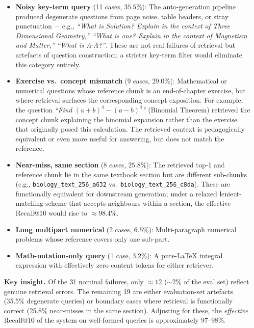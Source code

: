 \documentclass[conference]{IEEEtran}
\begin{document}
\begin{itemize}
    \item \textbf{Noisy key-term query} (11 cases, $35.5\%$): The auto-generation pipeline produced degenerate questions from page noise, table headers, or stray punctuation~--~e.g., \emph{``What is Solution? Explain in the context of Three Dimensional Geometry,''} \emph{``What is one? Explain in the context of Magnetism and Matter,''} \emph{``What is A$\cdot$A?''}. These are not real failures of retrieval but artefacts of question construction; a stricter key-term filter would eliminate this category entirely.
    \item \textbf{Exercise vs.\ concept mismatch} (9 cases, $29.0\%$): Mathematical or numerical questions whose reference chunk is an end-of-chapter exercise, but where retrieval surfaces the corresponding concept exposition. For example, the question \emph{``Find $(a+b)^4 - (a-b)^4$''} (Binomial Theorem) retrieved the concept chunk explaining the binomial expansion rather than the exercise that originally posed this calculation. The retrieved context is pedagogically equivalent or even more useful for answering, but does not match the reference.
    \item \textbf{Near-miss, same section} (8 cases, $25.8\%$): The retrieved top-1 and reference chunk lie in the same textbook section but are different sub-chunks (e.g., \texttt{biology\_text\_256\_a632} vs.\ \texttt{biology\_text\_256\_c8da}). These are functionally equivalent for downstream generation; under a relaxed lenient-matching scheme that accepts neighbours within a section, the effective Recall@10 would rise to ${\approx}98.4\%$.
    \item \textbf{Long multipart numerical} (2 cases, $6.5\%$): Multi-paragraph numerical problems whose reference covers only one sub-part.
    \item \textbf{Math-notation-only query} (1 case, $3.2\%$): A pure-LaTeX integral expression with effectively zero content tokens for either retriever.
\end{itemize}

\textbf{Key insight.} Of the 31 nominal failures, only ${\approx}12$ ($\sim\!2\%$ of the eval set) reflect genuine retrieval errors. The remaining 19 are either evaluation-set artefacts (35.5\% degenerate queries) or boundary cases where retrieval is functionally correct (25.8\% near-misses in the same section). Adjusting for these, the \emph{effective} Recall@10 of the system on well-formed queries is approximately $97$--$98\%$.
\end{document}
